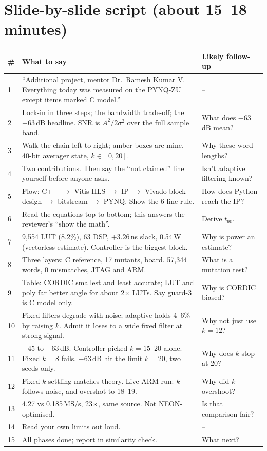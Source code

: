 \documentclass[10pt,a4paper]{article}
\begin{document}
\section{Slide-by-slide script (about 15--18 minutes)}
\begin{longtable}{@{}p{0.6cm}p{10.6cm}p{5.2cm}@{}}
\toprule \textbf{\#} & \textbf{What to say} & \textbf{Likely follow-up}\\ \midrule\endhead
1 & ``Additional project, mentor Dr.\ Ramesh Kumar V. Everything today was measured on the PYNQ-ZU except items marked C model.'' & --\\
2 & Lock-in in three steps; the bandwidth trade-off; the $-63$\,dB headline. SNR is $A^2/2\sigma^2$ over the full sample band. & What does $-63$\,dB mean?\\
3 & Walk the chain left to right; amber boxes are mine. 40-bit averager state, $k\in[0,20]$. & Why these word lengths?\\
4 & Two contributions. Then say the ``not claimed'' line yourself before anyone asks. & Isn't adaptive filtering known?\\
5 & Flow: C++ $\to$ Vitis HLS $\to$ IP $\to$ Vivado block design $\to$ bitstream $\to$ PYNQ. Show the 6-line rule. & How does Python reach the IP?\\
6 & Read the equations top to bottom; this answers the reviewer's ``show the math''. & Derive $t_{90}$.\\
7 & 9,554 LUT (8.2\%), 63 DSP, $+3.26$\,ns slack, 0.54\,W (vectorless estimate). Controller is the biggest block. & Why is power an estimate?\\
8 & Three layers: C reference, 17 mutants, board. 57,344 words, 0 mismatches, JTAG and ARM. & What is a mutation test?\\
9 & Table: CORDIC smallest and least accurate; LUT and poly far better angle for about 2$\times$ LUTs. Say guard-3 is C model only. & Why is CORDIC biased?\\
10 & Fixed filters degrade with noise; adaptive holds 4--6\% by raising $k$. Admit it loses to a wide fixed filter at strong signal. & Why not just use $k=12$?\\
11 & $-45$ to $-63$\,dB. Controller picked $k=15$--20 alone. Fixed $k=8$ fails. $-63$\,dB hit the limit $k=20$, two seeds only. & Why does $k$ stop at 20?\\
12 & Fixed-$k$ settling matches theory. Live ARM run: $k$ follows noise, and overshot to 18--19. & Why did $k$ overshoot?\\
13 & 4.27 vs 0.185\,MS/s, 23$\times$, same source. Not NEON-optimised. & Is that comparison fair?\\
14 & Read your own limits out loud. & --\\
15 & All phases done; report in similarity check. & What next?\\
\bottomrule
\end{longtable}
\end{document}
